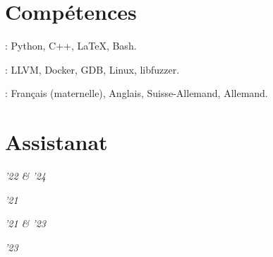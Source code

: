 \documentclass[mm, 11pt]{simple_style}
\begin{document}
\begin{resume}
\section{Compétences}
: Python, C++, \LaTeX, Bash.

: LLVM, Docker, GDB, Linux, libfuzzer.

: Français (maternelle), Anglais, Suisse-Allemand, Allemand.

\sectionline
\section{Assistanat}
%

 \hfill\textit{ '22 \& '24}

 \hfill \textit{'21}

 \hfill \textit{'21 \& '23}

 \hfill \textit{'23}

\sectionline
%
%


\end{resume}
\end{document}
